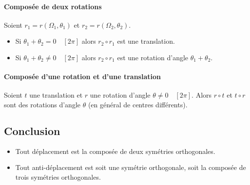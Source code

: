             \paragraph{Compos\'ee de deux rotations}
                  Soient $r_1 = r(\Omega_1 , \theta_1)$ et $r_2 = r(\Omega_2 , \theta_2)$.
                  \begin{itemize}
                        \item Si $\theta_1 + \theta_2 = 0 \quad [2\pi]$ alors $r_2 \circ r_1$ est une translation.
                        \item Si $\theta_1+\theta_2\neq 0\quad [2\pi]$ alors $r_2\circ r_1$ est 
                              une rotation d'angle $\theta_1+\theta_2$.
                  \end{itemize}
            \paragraph{Compos\'ee d'une rotation et d'une translation}
                  Soient $t$ une translation et $r$ une rotation d'angle $\theta \neq 0 \quad [2\pi]$.
                  Alors $r \circ t$ et $t \circ r$ sont des rotations d'angle $\theta$ (en g\'en\'eral de centres diff\'erents).
      \subsection{Conclusion}
            \begin{itemize}
                  \item Tout d\'eplacement est la compos\'ee de deux sym\'etries orthogonales.
                  \item Tout anti-d\'eplacement est soit une sym\'etrie orthogonale, 
                        soit la compos\'ee de trois sym\'etries orthogonales.
            \end{itemize}
















\TCDLessonStyleOff
\clearpage
\providecommand{\Droite}{(\mathscr{D})}
\providecommand{\AngleEgal}[3]{#1 = #2 \quad \left[ #3 \right] }
\providecommand{\mes}[2]{\mathrm{mes}\left( \widehat{ \overrightarrow{#1} , \overrightarrow{#2} } \right)}

